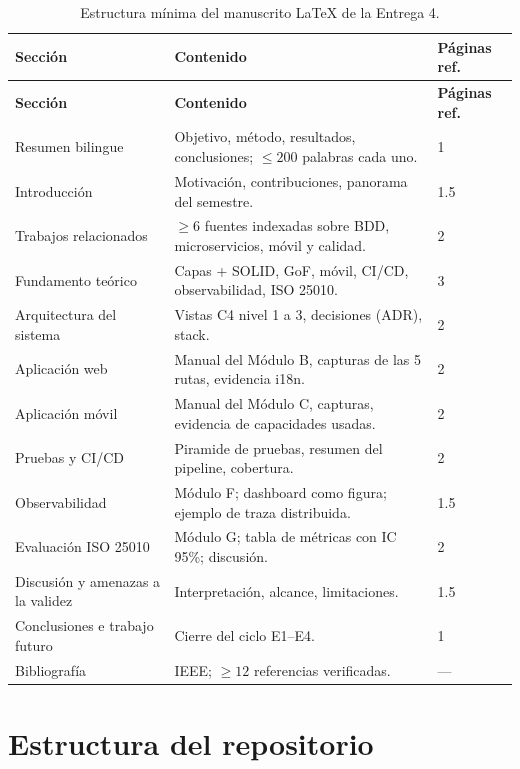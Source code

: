 \documentclass[11pt,a4paper]{article}
\begin{document}
    \renewcommand{\arraystretch}{1.15}
    \small
    \begin{xltabular}{\linewidth}{@{}p{3.4cm} X p{1.5cm}@{}}
        \caption{Estructura mínima del manuscrito LaTeX de la Entrega 4.}
        \label{tab:doc-e4}\\
        \toprule
        \textbf{Sección} & \textbf{Contenido} & \textbf{Páginas ref.}\\
        \midrule
        \endfirsthead
        \toprule
        \textbf{Sección} & \textbf{Contenido} & \textbf{Páginas ref.}\\
        \midrule
        \endhead
        \bottomrule
        \endfoot
        Resumen bilingue & Objetivo, método, resultados, conclusiones; $\le 200$ palabras cada uno. & 1\\
        Introducción & Motivación, contribuciones, panorama del semestre. & 1.5\\
        Trabajos relacionados & $\ge 6$ fuentes indexadas sobre BDD, microservicios, móvil y calidad. & 2\\
        Fundamento teórico & Capas + SOLID, GoF, móvil, CI/CD, observabilidad, ISO 25010. & 3\\
        Arquitectura del sistema & Vistas C4 nivel 1 a 3, decisiones (ADR), stack. & 2\\
        Aplicación web & Manual del Módulo B, capturas de las 5 rutas, evidencia i18n. & 2\\
        Aplicación móvil & Manual del Módulo C, capturas, evidencia de capacidades usadas. & 2\\
        Pruebas y CI/CD & Piramide de pruebas, resumen del pipeline, cobertura. & 2\\
        Observabilidad & Módulo F; dashboard como figura; ejemplo de traza distribuida. & 1.5\\
        Evaluación ISO 25010 & Módulo G; tabla de métricas con IC 95\%; discusión. & 2\\
        Discusión y amenazas a la validez & Interpretación, alcance, limitaciones. & 1.5\\
        Conclusiones e trabajo futuro & Cierre del ciclo E1--E4. & 1\\
        Bibliografía & IEEE; $\ge 12$ referencias verificadas. & ---\\
    \end{xltabular}
    \normalsize

\section{Estructura del repositorio}
\end{document}
